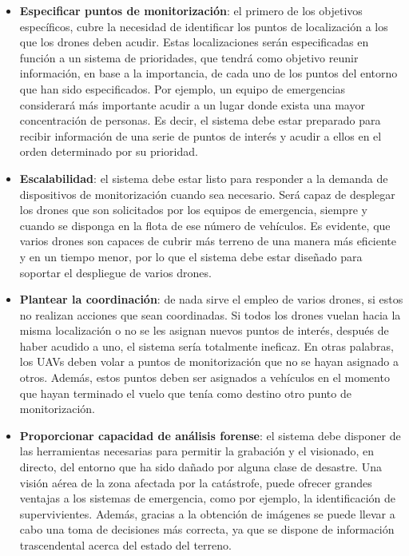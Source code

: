 \begin{itemize}
\item \textbf{Especificar puntos de monitorización}: el primero de los objetivos específicos, cubre la necesidad de identificar los puntos de localización a los que los drones deben acudir. Estas localizaciones serán especificadas en función a un sistema de prioridades, que tendrá como objetivo reunir información, en base a la importancia, de cada uno de los puntos del entorno que han sido especificados. Por ejemplo, un equipo de emergencias considerará más importante acudir a un lugar donde exista una mayor concentración de personas. Es decir, el sistema debe estar preparado para recibir información de una serie de puntos de interés y acudir a ellos en el orden determinado por su prioridad.

\item \textbf{Escalabilidad}: el sistema debe estar listo para responder a la demanda de dispositivos de monitorización cuando sea necesario. Será capaz de desplegar los drones que son solicitados por los equipos de emergencia, siempre y cuando se disponga en la flota de ese número de vehículos. Es evidente, que varios drones son capaces de cubrir más terreno de una manera más eficiente y en un tiempo menor, por lo que el sistema debe estar diseñado para soportar el despliegue de varios drones.

\item \textbf{Plantear la coordinación}: de nada sirve el empleo de varios drones, si estos no realizan acciones que sean coordinadas. Si todos los drones vuelan hacia la misma localización o no se les asignan nuevos puntos de interés, después de haber acudido a uno, el sistema sería totalmente ineficaz. En otras palabras, los \acs{UAV}s deben volar a puntos de monitorización que no se hayan asignado a otros. Además, estos puntos deben ser asignados a vehículos en el momento que hayan terminado el vuelo que tenía como destino otro punto de monitorización. 

\item \textbf{Proporcionar capacidad de análisis forense}: el sistema debe disponer de las herramientas necesarias para permitir la grabación y el visionado, en directo, del entorno que ha sido dañado por alguna clase de desastre. Una visión aérea de la zona afectada por la catástrofe, puede ofrecer grandes ventajas a los sistemas de emergencia, como por ejemplo, la identificación de supervivientes. Además, gracias a la obtención de imágenes se puede llevar a cabo una toma de decisiones más correcta, ya que se dispone de información trascendental acerca del estado del terreno.


\end{itemize}
